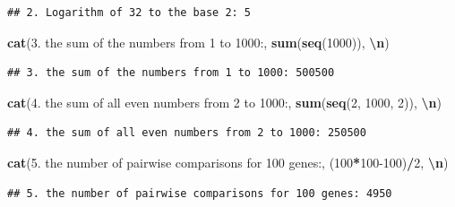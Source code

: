 \documentclass[
]{article}
\newenvironment{Shaded}{\begin{snugshade}}{\end{snugshade}}
\newcommand{\DecValTok}[1]{\textcolor[rgb]{0.00,0.00,0.81}{#1}}
\newcommand{\FunctionTok}[1]{\textcolor[rgb]{0.13,0.29,0.53}{\textbf{#1}}}
\newcommand{\NormalTok}[1]{#1}
\newcommand{\SpecialCharTok}[1]{\textcolor[rgb]{0.81,0.36,0.00}{\textbf{#1}}}
\newcommand{\StringTok}[1]{\textcolor[rgb]{0.31,0.60,0.02}{#1}}
\begin{document}
\begin{verbatim}
## 2. Logarithm of 32 to the base 2: 5
\end{verbatim}

\begin{Shaded}
\begin{Highlighting}[]
\FunctionTok{cat}\NormalTok{(}\StringTok{\textquotesingle{}3. the sum of the numbers from 1 to 1000:\textquotesingle{}}\NormalTok{, }\FunctionTok{sum}\NormalTok{(}\FunctionTok{seq}\NormalTok{(}\DecValTok{1000}\NormalTok{)), }\StringTok{\textquotesingle{}}\SpecialCharTok{\textbackslash{}n}\StringTok{\textquotesingle{}}\NormalTok{)}
\end{Highlighting}
\end{Shaded}

\begin{verbatim}
## 3. the sum of the numbers from 1 to 1000: 500500
\end{verbatim}

\begin{Shaded}
\begin{Highlighting}[]
\FunctionTok{cat}\NormalTok{(}\StringTok{\textquotesingle{}4. the sum of all even numbers from 2 to 1000:\textquotesingle{}}\NormalTok{, }\FunctionTok{sum}\NormalTok{(}\FunctionTok{seq}\NormalTok{(}\DecValTok{2}\NormalTok{, }\DecValTok{1000}\NormalTok{, }\DecValTok{2}\NormalTok{)), }\StringTok{\textquotesingle{}}\SpecialCharTok{\textbackslash{}n}\StringTok{\textquotesingle{}}\NormalTok{)}
\end{Highlighting}
\end{Shaded}

\begin{verbatim}
## 4. the sum of all even numbers from 2 to 1000: 250500
\end{verbatim}

\begin{Shaded}
\begin{Highlighting}[]
\FunctionTok{cat}\NormalTok{(}\StringTok{\textquotesingle{}5. the number of pairwise comparisons for 100 genes:\textquotesingle{}}\NormalTok{, (}\DecValTok{100}\SpecialCharTok{*}\DecValTok{100{-}100}\NormalTok{)}\SpecialCharTok{/}\DecValTok{2}\NormalTok{, }\StringTok{\textquotesingle{}}\SpecialCharTok{\textbackslash{}n}\StringTok{\textquotesingle{}}\NormalTok{)}
\end{Highlighting}
\end{Shaded}

\begin{verbatim}
## 5. the number of pairwise comparisons for 100 genes: 4950
\end{verbatim}
\end{document}
